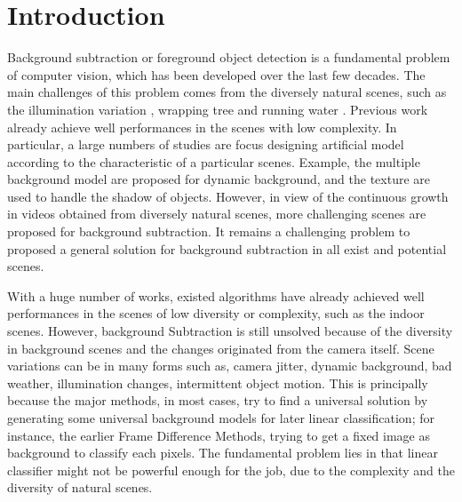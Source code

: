 \documentclass[journal]{IEEEtran}
\begin{document}
\section{Introduction}
Background subtraction or foreground object detection is a fundamental problem of computer vision, 
which has been developed over the last few decades.
The main challenges of this problem comes from the diversely natural scenes,
such as the illumination variation \cite{2017_REVIEW_7914756}, wrapping tree \cite{2014_CVIU_SOBRAL20144} and running water \cite{Bouwmans2014}.
Previous work already achieve well performances in the scenes with low complexity.
In particular,
a large numbers of studies are focus designing artificial model according to the characteristic of a particular scenes.
Example, the multiple background model are proposed for dynamic background,
and the texture are used to handle the shadow of objects.
However,
in view of
the continuous growth in videos obtained from diversely natural scenes,
more challenging scenes are proposed for background subtraction.
It remains a challenging problem to proposed a general solution for background subtraction in all exist and potential scenes.
%
% 
% 
% 
% 

With a huge number of works, existed algorithms have already achieved well performances in the scenes of low diversity or complexity, such as the indoor scenes.
However, background Subtraction is still unsolved because of the diversity in background scenes and the changes originated from the camera itself.
Scene variations can be in many forms such as, camera jitter, dynamic background, bad weather, illumination changes, intermittent object motion.
This is principally because the major methods, in most cases, try to find a universal solution by generating some universal background models for later linear classification; for instance, the earlier Frame Difference Methods, trying to get a fixed image as background to classify each pixels.
The fundamental problem lies in that linear classifier might not be powerful enough for the job, due to the complexity and the diversity of natural scenes.
\end{document}
